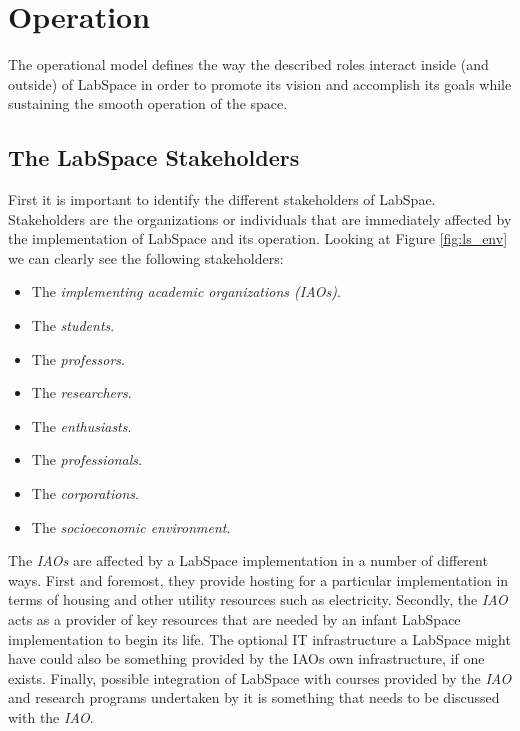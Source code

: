 \documentclass[a4paper, 11pt]{article}
\begin{document}


\section{Operation}

The operational model defines the way the described roles interact inside (and outside) of LabSpace in order to promote its vision and accomplish its goals while sustaining the smooth operation of the space.

\subsection{The LabSpace Stakeholders}
First it is important to identify the different stakeholders of LabSpae. Stakeholders are the organizations or individuals that are immediately affected by the implementation of LabSpace and its operation. Looking at Figure \ref{fig:ls_env} we can clearly see the following stakeholders:

\begin{itemize}[noitemsep]
    \item The \textit{implementing academic organizations (IAOs)}.
    \item The \textit{students}.
    \item The \textit{professors}.
    \item The \textit{researchers}.
    \item The \textit{enthusiasts}.
    \item The \textit{professionals}.
    \item The \textit{corporations}.
    \item The \textit{socioeconomic environment}.
\end{itemize}

The \textit{IAOs} are affected by a LabSpace implementation in a number of different ways. First and foremost, they provide hosting for a particular implementation in terms of housing and other utility resources such as electricity. Secondly, the \textit{IAO} acts as a provider of key resources that are needed by an infant LabSpace implementation to begin its life. The optional IT infrastructure a LabSpace might have could also be something provided by the IAOs own infrastructure, if one exists. Finally, possible integration of LabSpace with courses provided by the \textit{IAO} and research programs undertaken by it is something that needs to be discussed with the \textit{IAO}.
\end{document}
